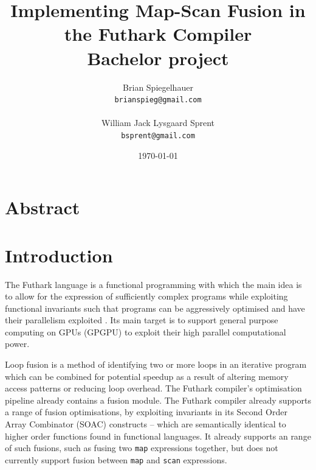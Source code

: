 \documentclass[11pt]{article}
\title{
  \vspace{3cm}
  \Huge{Implementing Map-Scan Fusion in the Futhark Compiler} \\
  \Large{Bachelor project}
}
\author{
  \Large{Brian Spiegelhauer}
  \\ \texttt{brianspieg@gmail.com} \\ \\
   \Large{William Jack Lysgaard Sprent}
  \\ \texttt{bsprent@gmail.com} \\
}
\date{
    \today
}
\def \ColourPDF {include/nat-farve}
\def \TitlePDF   {include/nat-en}  %
\begin{document}
\lstset{language=C, frame=single, numbers=left, breaklines=true}



\clearpage\maketitle
\thispagestyle{empty}

\newpage

\tableofcontents

\newpage

\section{Abstract}
\section{Introduction}

The Futhark language is a functional programming with which the main idea is to allow for the expression of sufficiently complex programs while exploiting functional invariants such that
 programs can be aggressively optimised and have their parallelism exploited \cite{futharkdoc}. Its main target is to support general purpose computing on GPUs (GPGPU) to exploit their high parallel
 computational power.

Loop fusion is a method of identifying two or more loops in an iterative program which can be combined for potential speedup as a result of altering memory access patterns  or reducing loop overhead.
 The Futhark compiler's optimisation pipeline already contains a fusion module. 
The Futhark compiler already supports a range of fusion optimisations, by exploiting invariants in its Second Order Array Combinator (SOAC) constructs -- which are semantically identical
 to higher order functions found in functional languages. \cite{T2Fusion} It already supports an range of such fusions, such as fusing two \texttt{map} expressions together,
 but does not currently support fusion between \texttt{map} and \texttt{scan} expressions.
\end{document}
